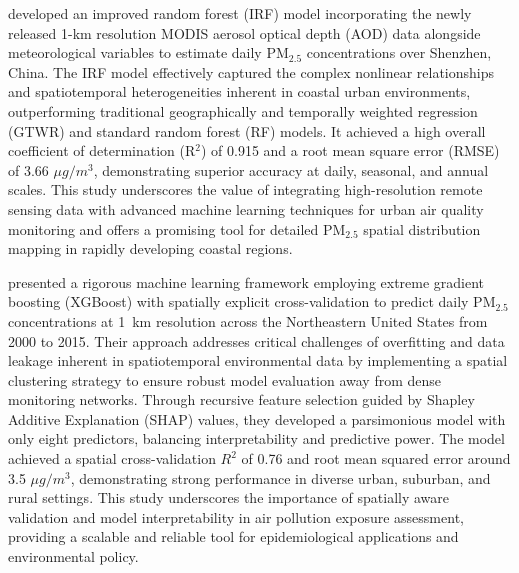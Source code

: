 \documentclass[11pt]{article}
\begin{document}
\citet{chen2020estimating} developed an improved random forest (IRF) model incorporating the newly released 1-km resolution MODIS aerosol optical depth (AOD) data alongside meteorological variables to estimate daily PM$_{2.5}$ concentrations over Shenzhen, China. The IRF model effectively captured the complex nonlinear relationships and spatiotemporal heterogeneities inherent in coastal urban environments, outperforming traditional geographically and temporally weighted regression (GTWR) and standard random forest (RF) models. It achieved a high overall coefficient of determination (R$^{2}$) of 0.915 and a root mean square error (RMSE) of 3.66 \(\mu g/m^{3}\), demonstrating superior accuracy at daily, seasonal, and annual scales. This study underscores the value of integrating high-resolution remote sensing data with advanced machine learning techniques for urban air quality monitoring and offers a promising tool for detailed PM$_{2.5}$ spatial distribution mapping in rapidly developing coastal regions.

\citet{just2020advancing} presented a rigorous machine learning framework employing extreme gradient boosting (XGBoost) with spatially explicit cross-validation to predict daily PM$_{2.5}$ concentrations at 1~km resolution across the Northeastern United States from 2000 to 2015. Their approach addresses critical challenges of overfitting and data leakage inherent in spatiotemporal environmental data by implementing a spatial clustering strategy to ensure robust model evaluation away from dense monitoring networks. Through recursive feature selection guided by Shapley Additive Explanation (SHAP) values, they developed a parsimonious model with only eight predictors, balancing interpretability and predictive power. The model achieved a spatial cross-validation \(R^{2}\) of 0.76 and root mean squared error around 3.5 \(\mu g/m^{3}\), demonstrating strong performance in diverse urban, suburban, and rural settings. This study underscores the importance of spatially aware validation and model interpretability in air pollution exposure assessment, providing a scalable and reliable tool for epidemiological applications and environmental policy.
\end{document}
